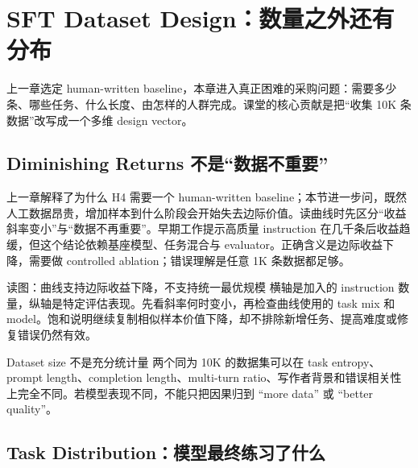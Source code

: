 \section{SFT Dataset Design：数量之外还有分布}

上一章选定 human-written baseline，本章进入真正困难的采购问题：需要多少条、哪些任务、什么长度、由怎样的人群完成。课堂的核心贡献是把“收集 10K 条数据”改写成一个多维 design vector。

\subsection{Diminishing Returns 不是“数据不重要”}

上一章解释了为什么 H4 需要一个 human-written baseline；本节进一步问，既然人工数据昂贵，增加样本到什么阶段会开始失去边际价值。读曲线时先区分“收益斜率变小”与“数据不再重要”。早期工作提示高质量 instruction 在几千条后收益趋缓，但这个结论依赖基座模型、任务混合与 evaluator。正确含义是边际收益下降，需要做 controlled ablation；错误理解是任意 1K 条数据都足够。


\begin{knowledgebox}{读图：曲线支持边际收益下降，不支持统一最优规模}
横轴是加入的 instruction 数量，纵轴是特定评估表现。先看斜率何时变小，再检查曲线使用的 task mix 和 model。饱和说明继续复制相似样本价值下降，却不排除新增任务、提高难度或修复错误仍然有效。
\end{knowledgebox}



\begin{importantbox}{Dataset size 不是充分统计量}
两个同为 10K 的数据集可以在 task entropy、prompt length、completion length、multi-turn ratio、写作者背景和错误相关性上完全不同。若模型表现不同，不能只把因果归到 ``more data'' 或 ``better quality''。
\end{importantbox}

\subsection{Task Distribution：模型最终练习了什么}

